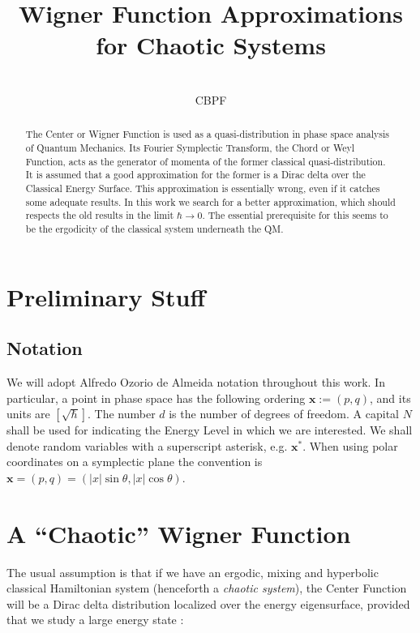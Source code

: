 \documentclass[a4paper,12pt]{article}
\title{ Wigner Function Approximations for Chaotic Systems}
\author{\\CBPF}
\newcommand{\xfase}{\mathbf{x}}
\begin{document}
\maketitle

\begin{abstract}


The Center or Wigner Function is used as a quasi-distribution in 
phase space analysis
of Quantum Mechanics. Its Fourier Symplectic Transform, 
the Chord or Weyl Function, 
acts as the generator of momenta of the former 
classical quasi-distribution. It is
assumed that a good approximation for the former is a Dirac delta over
the Classical Energy Surface. This approximation is essentially wrong,
even if it catches some adequate results.
In this work we search for a better approximation, which
should respects the old results in the limit $\hbar\rightarrow 0$.
The essential prerequisite for this seems to be the ergodicity of
the classical system underneath the QM.

\end{abstract}

\section{Preliminary Stuff}

\subsection{Notation}

We will adopt Alfredo Ozorio de Almeida notation throughout this work. 
In particular, a point in phase space has the 
following ordering  $\xfase:=(p,q)$, and its units are $[\sqrt{\hbar}]$.
The number $d$ is the number of degrees of freedom. A capital $N$ shall
be used for indicating the Energy Level in which we are interested.
We shall denote random  variables with a superscript asterisk, e.g.
$\xfase^*$. When using polar coordinates on a symplectic plane
the convention is $\xfase=(p,q)=(|x|\sin\theta, |x|\cos\theta)$.

\section{A ``Chaotic'' Wigner Function}

The usual assumption is that if we have an ergodic, mixing and hyperbolic
classical Hamiltonian system (henceforth a \emph{chaotic system}), the
Center Function will be a Dirac delta distribution localized over the
energy eigensurface, provided that we study  a large 
energy state \cite{Voros76}:
\end{document}
